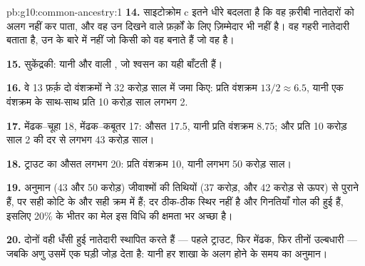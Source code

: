 \begin{solution}{pb:g10:common-ancestry:1}
\textbf{14.} साइटोक्रोम c इतने धीरे बदलता है कि वह क़रीबी नातेदारों को
अलग नहीं कर पाता, और वह उन दिखने वाले फ़र्क़ों के लिए ज़िम्मेदार  भी
नहीं है। वह गहरी नातेदारी बताता है, उन  के बारे में नहीं जो किसी
 को वह बनाते हैं जो वह है।

\textbf{15.} सुकेंद्रकी: यानी  और  वाली , जो
श्वसन का यही  बाँटती हैं।

\textbf{16.} वे 13 फ़र्क़ दो वंशक्रमों ने 32 करोड़ साल में जमा किए:
प्रति वंशक्रम $13/2 \approx 6.5$, यानी एक वंशक्रम के साथ-साथ प्रति 10
करोड़ साल लगभग 2.

\textbf{17.} मेंढक--चूहा 18, मेंढक--कबूतर 17: औसत 17.5, यानी प्रति
वंशक्रम 8.75; और प्रति 10 करोड़ साल 2 की दर से लगभग 43 करोड़ साल।

\textbf{18.} ट्राउट का औसत लगभग 20: प्रति वंशक्रम 10, यानी लगभग 50
करोड़ साल।

\textbf{19.} अनुमान (43 और 50 करोड़) जीवाश्मों की तिथियों (37 करोड़, और
42 करोड़ से ऊपर) से पुराने हैं, पर सही कोटि के और सही क्रम में हैं; दर
ठीक-ठीक स्थिर नहीं है और गिनतियाँ गोल की हुई हैं, इसलिए 20\% के भीतर का
मेल इस विधि की क्षमता भर अच्छा है।

\textbf{20.} दोनों वही धँसी हुई नातेदारी स्थापित करते हैं --- पहले
ट्राउट, फिर मेंढक, फिर तीनों उल्बधारी --- जबकि अणु उसमें एक घड़ी जोड़ देता
है: यानी हर शाखा के अलग होने के समय का अनुमान।
\end{solution}
